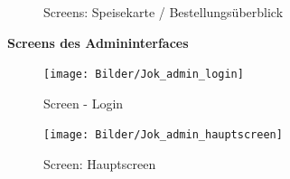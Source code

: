 			\begin{figure}[H]
			\begin{centering}
			\par\end{centering}
			\caption{Screens: Speisekarte / Bestellungsüberblick}
			\label{Screens: Speisekarte / Bestellungsüberblick}
			\end{figure}
\textbf{Screens des Admininterfaces}
			\begin{figure}[H]
			\begin{centering}
			\texttt{[image: Bilder/Jok\_admin\_login]}
			\par\end{centering}
			\caption{Screen - Login}
			\label{Screen - Login}
			\end{figure}
			\begin{figure}[H]
			\begin{centering}
			\texttt{[image: Bilder/Jok\_admin\_hauptscreen]}
			\par\end{centering}
			\caption{Screen: Hauptscreen}
			\label{Screen: Hauptscreen}
			\end{figure}
